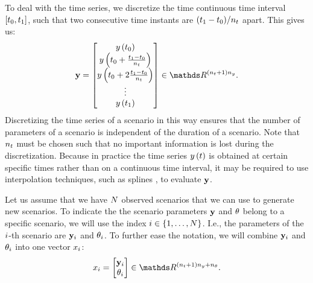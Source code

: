 To deal with the time series, we discretize the time continuous time interval $[t_0, t_1]$, such that two consecutive time instants are $(t_1 - t_0) / n_t$ apart. 
This gives us:
\begin{equation}
	\label{eq:time series vectorized}
	\timeseriesvec = \begin{bmatrix}
		\timeseries{\timestart} \\ 
		\timeseries{\timestart + \frac{\timeend - \timestart}{\numberoftimesegments}} \\
		\timeseries{\timestart + 2\frac{\timeend - \timestart}{\numberoftimesegments}} \\
		\vdots \\
		\timeseries{\timeend}
	\end{bmatrix} \in \realnumbers^{\left( \numberoftimesegments + 1 \right) \dimensiontimeseries}.
\end{equation}
Discretizing the time series of a scenario in this way ensures that the number of parameters of a scenario is independent of the duration of a scenario. 
Note that $n_t$ must be chosen such that no important information is lost during the discretization.
Because in practice the time series $y\left(t\right)$ is obtained at certain specific times rather than on a continuous time interval, it may be required to use interpolation techniques, such as splines \autocite{deboor1978practical}, to evaluate $\mathbf{y}$.

Let us assume that we have $N$ observed scenarios that we can use to generate new scenarios. 
To indicate the the scenario parameters $\mathbf{y}$ and $\theta$ belong to a specific scenario, we will use the index $i \in \{1,\ldots,N\}$. 
I.e., the parameters of the $i$-th scenario are $\mathbf{y}_{i}$ and $\theta_{i}$.
To further ease the notation, we will combine $\mathbf{y}_{i}$ and $\theta_{i}$ into one vector $x_{i}$:
\begin{equation}
	\label{eq:scenario parameters}
	\scenariopars_{\scenarioindex} = \begin{bmatrix}
		\timeseriesvec_{\scenarioindex} \\ \extraparameters_{\scenarioindex}
	\end{bmatrix} \in \realnumbers^{\left( \numberoftimesegments + 1 \right) \dimensiontimeseries + \dimensionextraparameters}.
\end{equation}



